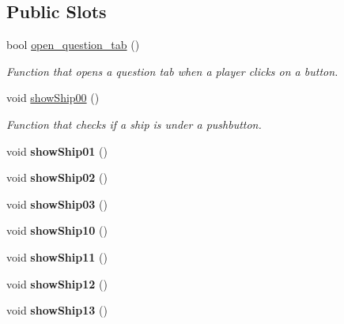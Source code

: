 \subsection*{Public Slots}
\begin{DoxyCompactItemize}
\item 
bool \hyperlink{classbattleship_a0744ad364092e726f52bdaac336581e5}{open\+\_\+question\+\_\+tab} ()
\begin{DoxyCompactList}\small\item\em Function that opens a question tab when a player clicks on a button. \end{DoxyCompactList}\item 
void \hyperlink{classbattleship_afd1d4e449ff0b266871eca956b406b2b}{show\+Ship00} ()
\begin{DoxyCompactList}\small\item\em Function that checks if a ship is under a pushbutton. \end{DoxyCompactList}\item 
\mbox{\label{classbattleship_ad6379760759a77a0b479983b08068138}} 
void {\bfseries show\+Ship01} ()
\item 
\mbox{\label{classbattleship_ac5e8d56e60d0cd00c23b2391de838416}} 
void {\bfseries show\+Ship02} ()
\item 
\mbox{\label{classbattleship_a1bd31ba45a22552797d03914fabdfa5b}} 
void {\bfseries show\+Ship03} ()
\item 
\mbox{\label{classbattleship_a21c04d344578bc5ccf50ec8bb6143cc5}} 
void {\bfseries show\+Ship10} ()
\item 
\mbox{\label{classbattleship_a072ca835236dc8cbae004e6295d55eba}} 
void {\bfseries show\+Ship11} ()
\item 
\mbox{\label{classbattleship_ade3e18ff71103bed1baf78fd551460f2}} 
void {\bfseries show\+Ship12} ()
\item 
\mbox{\label{classbattleship_ac22320ed94718a56d6c03593a26ae0e1}} 
void {\bfseries show\+Ship13} ()
\item 
\mbox{\label{classbattleship_a77ea25213dad52f754ca640225c5bafa}} 

\end{DoxyCompactItemize}
